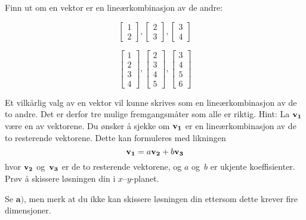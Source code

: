 \begin{oppgave}
Finn ut om en vektor er en lineærkombinasjon av de andre:
\begin{punkt}
$$
\begin{bmatrix}
1\\
2
\end{bmatrix},
\begin{bmatrix}
2\\
3
\end{bmatrix},
\begin{bmatrix}
3\\
4
\end{bmatrix}
$$
\end{punkt}
\begin{punkt}
	$$
	\begin{bmatrix}
	1\\
	2\\
	3\\
	4
	\end{bmatrix},
	\begin{bmatrix}
	2\\
	3\\
	4\\
	5
	\end{bmatrix},
	\begin{bmatrix}
	3\\
	4\\
	5\\
	6
	\end{bmatrix}
	$$
\end{punkt}

\end{oppgave}
\begin{losning}
\begin{punkt}
Et vilkårlig valg av en vektor vil kunne skrives som en lineærkombinasjon av de to andre. Det er derfor tre mulige fremgangsmåter som alle er riktig.
Hint: La $\mathbf{v_1}$ være en av vektorene. Du ønsker å sjekke om $\mathbf{v_1}$ er en lineærkombinasjon av de to resterende vektorene. Dette kan formuleres med likningen $$\mathbf{v_1}=a\mathbf{v_2}+b\mathbf{v_3}$$ hvor $\mathbf{v_2}$ og~$\mathbf{v_3}$ er de to resterende vektorene, og $a$ og~$b$ er ukjente koeffisienter. Prøv å skissere løsningen din i $x$--$y$-planet.
\end{punkt}
\begin{punkt}
Se $\textbf{a)}$, men merk at du ikke kan skissere løsningen din ettersom dette krever fire dimensjoner. 
\end{punkt}
\end{losning}



